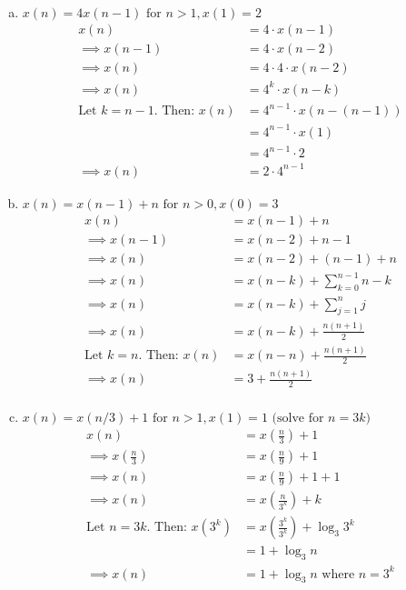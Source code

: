 \documentclass[11pt]{article}
\begin{document}
\begin{enumerate}[(a)]
\item $x(n) = 4 x(n-1) \text{ for } n > 1, x(1) = 2$
\begin{align*}
x(n) &= 4 \cdot x(n-1) \\
\implies x(n-1) &= 4 \cdot x(n-2)\\
\implies x(n) &= 4 \cdot 4 \cdot x(n-2)\\
\implies x(n) &= 4^k \cdot x(n-k)\\
\text{Let }k=n-1. \text{ Then: } 
x(n) &= 4^{n-1} \cdot x(n-(n-1))\\
&= 4^{n-1} \cdot x(1)\\
&= 4^{n-1} \cdot 2\\
\implies x(n) &= 2 \cdot 4^{n-1}
\end{align*}

\item $x(n) = x(n-1) + n \text{ for } n > 0, x(0) = 3$
\begin{align*}
x(n) &= x(n-1) + n\\
\implies x(n-1) &= x(n-2) + n-1\\
\implies x(n) &= x(n-2) + (n-1) + n\\
\implies x(n) &= x(n-k) + \sum_{k=0}^{n-1}n-k\\
\implies x(n) &= x(n-k) + \sum_{j=1}^{n}j\\
\implies x(n) &= x(n-k) + \frac{n(n+1)}{2}\\
\text{Let }k=n. \text{ Then: } 
x(n) &= x(n-n) + \frac{n(n+1)}{2}\\
\implies x(n) &= 3 + \frac{n(n+1)}{2}\\
\end{align*}

\item $x(n) = x(n/3) + 1 \text{ for } n > 1, x(1) = 1 \text{ (solve for } 
n = 3k)$
\begin{align*}
x(n) &= x\left(\frac{n}{3}\right) + 1\\
\implies x\left(\frac{n}{3}\right) &= x\left(\frac{n}{9}\right) + 1\\
\implies x(n) &= x\left(\frac{n}{9}\right) + 1 + 1\\
\implies x(n) &= x\left(\frac{n}{3^k}\right) + k\\
\text{Let }n=3k. \text{ Then: }
x\left(3^k\right) &= x\left(\frac{3^k}{3^k}\right) + \log_3 3^k\\
&= 1 + \log_3 n\\
\implies x(n) &= 1 + \log_3 n \text{ where } n = 3^k 
\end{align*}
\end{enumerate}
\end{document}
